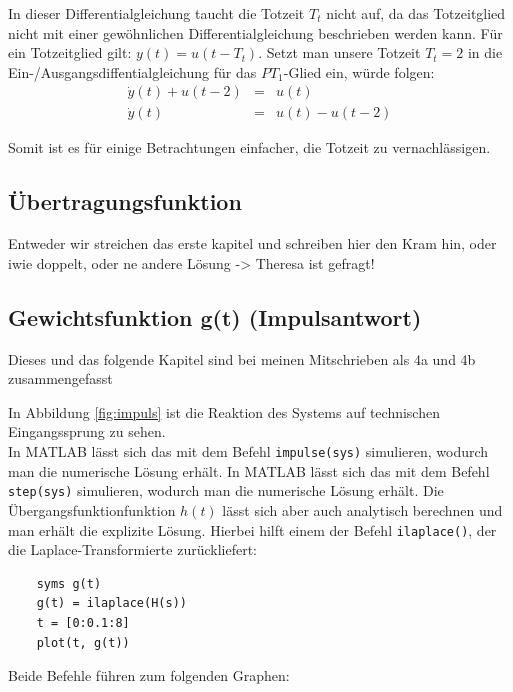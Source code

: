 In dieser Differentialgleichung taucht die Totzeit $T_t$ nicht auf, da das Totzeitglied nicht mit einer gewöhnlichen Differentialgleichung beschrieben werden kann. Für ein Totzeitglied gilt: $y(t) = u(t-T_t)$. Setzt man unsere Totzeit $T_t = 2$ in die Ein-/Ausgangsdiffentialgleichung für das $PT_1$-Glied ein, würde folgen:
\begin{eqnarray*}
    \dot y(t) + u(t - 2) &=& u(t) \\
    \dot y(t) &=& u(t) - u(t-2)
\end{eqnarray*}

Somit ist es für einige Betrachtungen einfacher, die Totzeit zu vernachlässigen.

\subsection{Übertragungsfunktion}
Entweder wir streichen das erste kapitel und schreiben hier den Kram hin, oder iwie doppelt, oder ne andere Lösung -> Theresa ist gefragt!

\subsection{Gewichtsfunktion g(t) (Impulsantwort)}
Dieses und das folgende Kapitel sind bei meinen Mitschrieben als 4a und 4b zusammengefasst


In Abbildung \ref{fig:impuls} ist die Reaktion des Systems auf technischen Eingangssprung zu sehen.
\\
In MATLAB lässt sich das mit dem Befehl \texttt{impulse(sys)} simulieren, wodurch man die numerische Lösung erhält. In MATLAB lässt sich das mit dem Befehl \texttt{step(sys)} simulieren, wodurch man die numerische Lösung erhält. Die Übergangsfunktionfunktion $h(t)$ lässt sich aber auch analytisch berechnen und man erhält die explizite Lösung. Hierbei hilft einem der Befehl \texttt{ilaplace()}, der die Laplace-Transformierte zurückliefert:
\begin{lstlisting}
    syms g(t)
    g(t) = ilaplace(H(s))
    t = [0:0.1:8]
    plot(t, g(t))
\end{lstlisting}

Beide Befehle führen zum folgenden Graphen:



